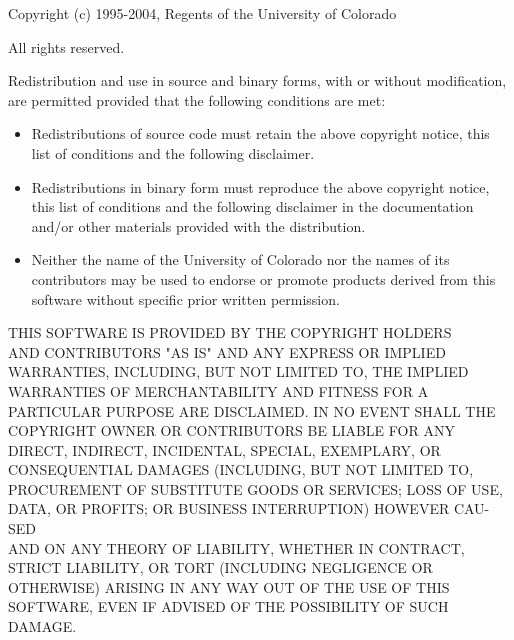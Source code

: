 \documentclass[a4paper,10pt]{article}
\begin{document}
Copyright (c) 1995-2004, Regents of the University of Colorado

All rights reserved.

Redistribution and use in source and binary forms, with or without
modification, are permitted provided that the following conditions
are met:

\begin{itemize}
\item
Redistributions of source code must retain the above copyright
notice, this list of conditions and the following disclaimer.
\item
Redistributions in binary form must reproduce the above copyright
notice, this list of conditions and the following disclaimer in the
documentation and/or other materials provided with the distribution.
\item
Neither the name of the University of Colorado nor the names of its
contributors may be used to endorse or promote products derived from
this software without specific prior written permission.
\end{itemize}
THIS SOFTWARE IS PROVIDED BY THE COPYRIGHT HOLDERS \\ AND CONTRIBUTORS
"AS IS" AND ANY EXPRESS OR IMPLIED WARRANTIES, INCLUDING, BUT NOT
LIMITED TO, THE IMPLIED WARRANTIES OF MERCHANTABILITY AND FITNESS
FOR A PARTICULAR PURPOSE ARE DISCLAIMED. IN NO EVENT SHALL THE
COPYRIGHT OWNER OR CONTRIBUTORS BE LIABLE FOR ANY DIRECT, INDIRECT,
INCIDENTAL, SPECIAL, EXEMPLARY, OR CONSEQUENTIAL DAMAGES (INCLUDING,
BUT NOT LIMITED TO, PROCUREMENT OF SUBSTITUTE GOODS OR SERVICES;
LOSS OF USE, DATA, OR PROFITS; OR BUSINESS INTERRUPTION) HOWEVER
CAU-SED
\\ AND ON ANY THEORY OF LIABILITY, WHETHER IN CONTRACT, STRICT
LIABILITY, OR TORT (INCLUDING NEGLIGENCE OR OTHERWISE) ARISING IN
ANY WAY OUT OF THE USE OF THIS SOFTWARE, EVEN IF ADVISED OF THE
POSSIBILITY OF SUCH DAMAGE.




\end{document}

